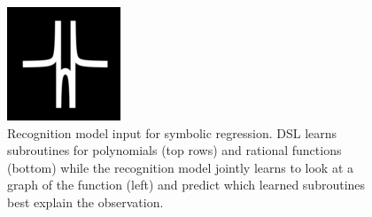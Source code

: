 \documentclass{article}
\newcommand{\systemEnding}{\textsc{DreamCoder}}
\newcommand{\code}[1]{{\footnotesize\texttt{#1}}}
\begin{document}
\begin{figure}
\begin{minipage}[c]{0.3\columnwidth}
    \includegraphics[width = \functionSize]{figures/functions/149.png}
  \end{minipage}
  \begin{minipage}[c]{0.69\columnwidth}    
    \caption{Recognition model input for symbolic regression. DSL learns subroutines for polynomials (top rows) and rational functions (bottom) while the recognition  model jointly learns to look at a graph of the function (left) and predict which learned subroutines best explain the observation.}\label{functions}\vspace{-1cm}
        \end{minipage}
\end{figure}




\end{document}
